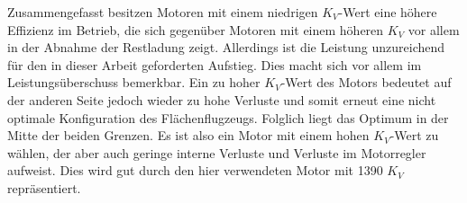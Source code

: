 Zusammengefasst besitzen Motoren mit einem niedrigen \ensuremath{K_V}-Wert eine höhere Effizienz im Betrieb, die sich gegenüber Motoren mit einem höheren \ensuremath{K_V} vor allem in der Abnahme der Restladung zeigt. Allerdings ist die Leistung unzureichend für den in dieser Arbeit geforderten Aufstieg. Dies macht sich vor allem im Leistungsüberschuss bemerkbar. Ein zu hoher \ensuremath{K_V}-Wert des Motors bedeutet auf der anderen Seite jedoch wieder zu hohe Verluste und somit erneut eine nicht optimale Konfiguration des Flächenflugzeugs. Folglich liegt das Optimum in der Mitte der beiden Grenzen. Es ist also ein Motor mit einem hohen \ensuremath{K_V}-Wert zu wählen, der aber auch geringe interne Verluste und Verluste im Motorregler aufweist. Dies wird gut durch den hier verwendeten Motor mit 1390 \ensuremath{K_V} repräsentiert. \\



